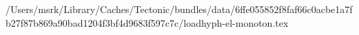 /Users/msrk/Library/Caches/Tectonic/bundles/data/6ffe055852f8faf66c0acbe1a7fb27f87b869a90bad1204f3bf4d9683f597c7c/loadhyph-el-monoton.tex